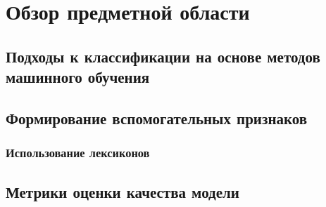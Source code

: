 \newpage
\section{Обзор предметной области}
    \subsection{Подходы к классификации на основе методов машинного обучения}
    \subsection{Формирование вспомогательных признаков}
        \subsubsection{Использование лексиконов}
    \subsection{Метрики оценки качества модели}

